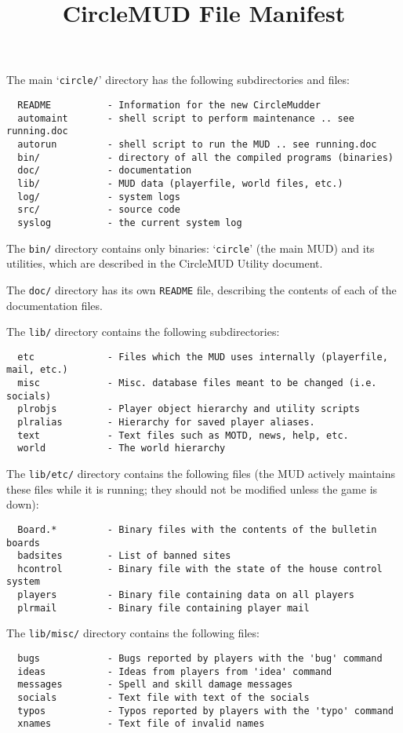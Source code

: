 \documentclass[11pt]{article}
\title{CircleMUD File Manifest}
\author{}
\begin{document}
\maketitle

The main `\texttt{circle/}' directory has the following subdirectories and files:

\begin{verbatim}
  README          - Information for the new CircleMudder
  automaint       - shell script to perform maintenance .. see running.doc
  autorun         - shell script to run the MUD .. see running.doc
  bin/            - directory of all the compiled programs (binaries)
  doc/            - documentation
  lib/            - MUD data (playerfile, world files, etc.)
  log/            - system logs
  src/            - source code
  syslog          - the current system log
\end{verbatim}

The \texttt{bin/} directory contains only binaries: `\texttt{circle}' (the main MUD) and its utilities, which are described in the CircleMUD Utility document.
\par
The \texttt{doc/} directory has its own \texttt{README} file, describing the contents of each of the documentation files.
\par
The \texttt{lib/} directory contains the following subdirectories:
\begin{verbatim}
  etc             - Files which the MUD uses internally (playerfile, mail, etc.)
  misc            - Misc. database files meant to be changed (i.e. socials)
  plrobjs         - Player object hierarchy and utility scripts
  plralias        - Hierarchy for saved player aliases.
  text            - Text files such as MOTD, news, help, etc.
  world           - The world hierarchy
\end{verbatim}

The \texttt{lib/etc/} directory contains the following files (the MUD actively maintains these files while it is running; they should not be modified unless the game is down):
\begin{verbatim}
  Board.*         - Binary files with the contents of the bulletin boards
  badsites        - List of banned sites
  hcontrol        - Binary file with the state of the house control system
  players         - Binary file containing data on all players
  plrmail         - Binary file containing player mail
\end{verbatim}

The \texttt{lib/misc/} directory contains the following files:
\begin{verbatim}
  bugs            - Bugs reported by players with the 'bug' command
  ideas           - Ideas from players from 'idea' command
  messages        - Spell and skill damage messages
  socials         - Text file with text of the socials
  typos           - Typos reported by players with the 'typo' command
  xnames          - Text file of invalid names
\end{verbatim}
\end{document}
